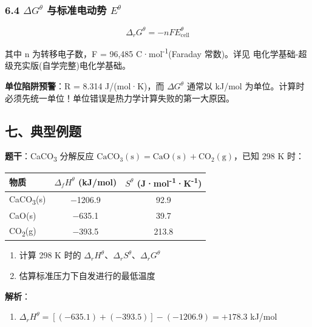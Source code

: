 \documentclass[a4paper,11pt]{ctexart}
\providecommand{\tightlist}{\setlength{\itemsep}{0pt}\setlength{\parskip}{0pt}}
\newcounter{none}
\newcommand{\箭}{\ensuremath{\rightarrow}}
\newcommand{\左箭}{\ensuremath{\leftarrow}}
\newcommand{\上箭}{\ensuremath{\uparrow}}
\newcommand{\下箭}{\ensuremath{\downarrow}}
\newcommand{\衡}{\ensuremath{\rightleftharpoons}}
\newcommand{\双箭}{\ensuremath{\leftrightarrow}}
\newcommand{\约等于}{\ensuremath{\approx}}
\newcommand{\小于等于}{\ensuremath{\leq}}
\newcommand{\大于等于}{\ensuremath{\geq}}
\newcommand{\不等于}{\ensuremath{\neq}}
\newcommand{\西格马}{\ensuremath{\sigma}}
\newcommand{\派}{\ensuremath{\pi}}
\begin{document}
\subsubsection{\texorpdfstring{6.4 \(\Delta G^\theta\) 与标准电动势 \(E^\theta\)}{6.4 \textbackslash Delta G\^{}\textbackslash theta 与标准电动势 E\^{}\textbackslash theta}}\label{delta-gtheta-ux4e0eux6807ux51c6ux7535ux52a8ux52bf-etheta}

\[
\Delta_r G^\theta = -nFE^\theta_{\text{cell}}
\]

其中 n 为转移电子数，F = 96,485 C·mol\textsuperscript{-1}(Faraday 常数)。详见 电化学基础-超级充实版(自学完整)\textbar 电化学基础。

\textbf{单位陷阱预警}：R = 8.314 J/(mol·K)，而 \(\Delta G^\theta\) 通常以 kJ/mol 为单位。计算时必须先统一单位！单位错误是热力学计算失败的第一大原因。

\subsection{七、典型例题}\label{ux4e03ux5178ux578bux4f8bux9898}

\textbf{题干}：CaCO\textsubscript{3} 分解反应 \(\mathrm{CaCO_3(s) = CaO(s) + CO_2(g)}\)，已知 298 K 时：

{\def\LTcaptype{none} %
\begin{longtable}[]{@{}lcc@{}}
\toprule\noalign{}
物质 & \(\Delta_f H^\theta\) (kJ/mol) & \(S^\theta\) (J·mol\textsuperscript{-1}·K\textsuperscript{-1}) \\
\midrule\noalign{}
\endhead
\bottomrule\noalign{}
\endlastfoot
CaCO\textsubscript{3}(s) & −1206.9 & 92.9 \\
CaO(s) & −635.1 & 39.7 \\
CO\textsubscript{2}(g) & −393.5 & 213.8 \\
\end{longtable}
}

\begin{enumerate}
\def\labelenumi{(\arabic{enumi})}
\tightlist
\item
  计算 298 K 时的 \(\Delta_r H^\theta\)、\(\Delta_r S^\theta\)、\(\Delta_r G^\theta\)
\item
  估算标准压力下自发进行的最低温度
\end{enumerate}

\textbf{解析}：

\begin{enumerate}
\def\labelenumi{(\arabic{enumi})}
\tightlist
\item
  \(\Delta_r H^\theta = [(-635.1) + (-393.5)] - (-1206.9) = +178.3\) kJ/mol
\end{enumerate}
\end{document}
